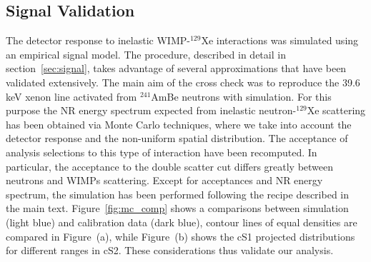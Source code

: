 

\subsection{Signal Validation}


The detector response to inelastic WIMP-$^{129}$Xe interactions was simulated using an empirical signal model. 
The procedure, described in detail in section~\ref{sec:signal}, takes advantage of several 
approximations that have been validated extensively. 
The main aim of the cross check was to reproduce the 39.6\,keV xenon line activated from $^{241}$AmBe neutrons with simulation.
For this purpose the NR energy spectrum expected from inelastic neutron-$^{129}$Xe scattering has been obtained via  Monte Carlo techniques, 
where we take into account the  detector response and the non-uniform spatial distribution. The acceptance of analysis selections to this type of interaction 
have been recomputed. In particular, the acceptance to the double scatter cut differs greatly between neutrons and WIMPs scattering. 
Except for acceptances and NR energy spectrum, the simulation has been performed following the recipe described in the main text. Figure~\ref{fig:mc_comp}
shows a comparisons between simulation (light blue) and calibration data (dark blue), contour lines of equal densities are compared in Figure~(a), 
while Figure~(b) shows the cS1 projected distributions for different ranges in cS2. These considerations thus validate our analysis.



